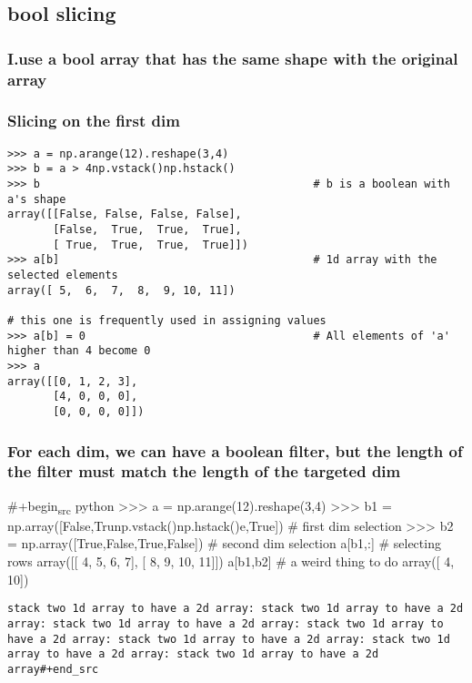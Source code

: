 \documentclass[11pt]{article}
\begin{document}
\subsection{bool slicing}
\label{sec:org6ba93e0}
\subsubsection{I.use a bool array that has the same shape with the original array}
\label{sec:org9b2dca4}
\subsubsection{Slicing on the first dim}
\label{sec:orgcca6cba}




\begin{verbatim}
>>> a = np.arange(12).reshape(3,4)
>>> b = a > 4np.vstack()np.hstack()
>>> b                                          # b is a boolean with a's shape
array([[False, False, False, False],
       [False,  True,  True,  True],
       [ True,  True,  True,  True]])
>>> a[b]                                       # 1d array with the selected elements
array([ 5,  6,  7,  8,  9, 10, 11])

# this one is frequently used in assigning values
>>> a[b] = 0                                   # All elements of 'a' higher than 4 become 0
>>> a
array([[0, 1, 2, 3],
       [4, 0, 0, 0],
       [0, 0, 0, 0]])
\end{verbatim}
\subsubsection{For each dim, we can have a boolean filter, but the length of the filter must match the length of the targeted dim}
\label{sec:org0bf939e}
\#+begin\textsubscript{src} python
>>> a = np.arange(12).reshape(3,4)
>>> b1 = np.array([False,Trunp.vstack()np.hstack()e,True])             \# first dim selection
>>> b2 = np.array([True,False,True,False])       \# second dim selection
a[b1,:]                                   \# selecting rows
array([[ 4,  5,  6,  7],
       [ 8,  9, 10, 11]])
a[b1,b2]                                  \# a weird thing to do
array([ 4, 10]) 
\begin{verbatim}
stack two 1d array to have a 2d array: stack two 1d array to have a 2d array: stack two 1d array to have a 2d array: stack two 1d array to have a 2d array: stack two 1d array to have a 2d array: stack two 1d array to have a 2d array: stack two 1d array to have a 2d array#+end_src
\end{verbatim}
\end{document}
